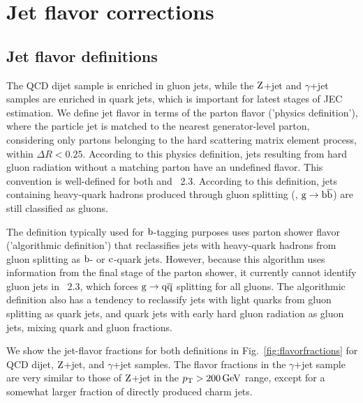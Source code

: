 \documentclass[11pt,twoside,a4paper,cmspaper,final,collab]{cms-tdr}
\begin{document}
\section{Jet flavor corrections}
\label{sec:l5}

\subsection{Jet flavor definitions}

The QCD dijet sample is enriched in gluon jets, while the $\mathrm{Z}$+jet and $\gamma$+jet samples are enriched in quark jets, which is important for latest stages of JEC estimation. We define jet flavor in terms of the parton flavor ('physics definition'), where the particle jet is matched to the nearest generator-level parton, considering only partons belonging to the hard scattering  matrix element process, within $\Delta R<0.25$. According to this physics definition, jets resulting from hard gluon radiation without a matching parton have an undefined flavor. This convention is well-defined for both  and \HERWIGpp~2.3. According to this definition, jets containing heavy-quark hadrons produced through gluon splitting (\eg, $ \mathrm{g} \to \mathrm{b}\overline{\mathrm{b}}$) are still classified as gluons.

The definition typically used for $\mathrm{b}$-tagging purposes uses parton shower flavor ('algorithmic definition') that reclassifies jets with heavy-quark hadrons from gluon splitting as $\mathrm{b}$- or $\mathrm{c}$-quark jets. However, because this algorithm uses information from the final stage of the parton shower, it currently cannot identify gluon jets in \HERWIGpp~2.3, which forces $ \mathrm{g} \to \mathrm{q} \overline{\mathrm{q}} $ splitting for all gluons. The algorithmic definition also has a tendency to reclassify jets with light quarks from gluon splitting as quark jets, and quark jets with early hard gluon radiation as gluon jets, mixing quark and gluon fractions.

We show the jet-flavor fractions for both definitions in Fig.~\ref{fig:flavorfractions} for QCD dijet, $\mathrm{Z}$+jet, and $\gamma$+jet samples. The flavor fractions in the $\gamma$+jet sample are very similar to those of $\mathrm{Z}$+jet in the $p_{\mathrm{T}}>200\,\text{Ge\hspace{-.08em}V}$ range, except for a somewhat larger fraction of directly produced charm jets.
\end{document}
